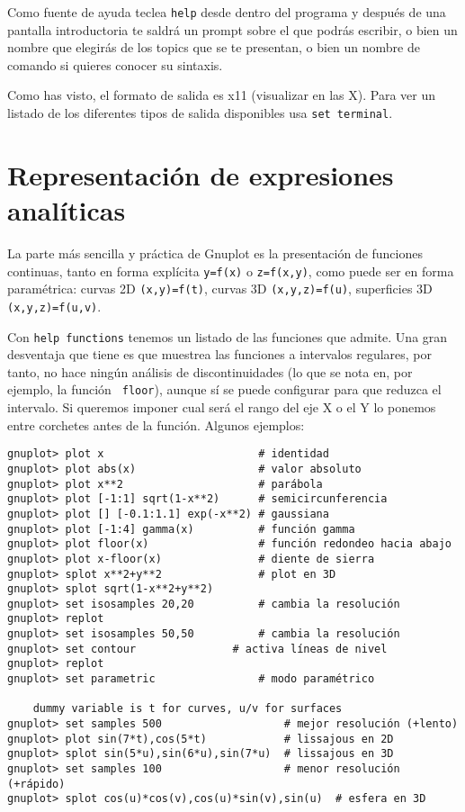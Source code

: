 Como fuente  de ayuda teclea  {\tt help}  desde dentro del  programa y
después de una pantalla introductoria te saldrá un prompt sobre el que
podrás escribir, o bien un nombre que elegirás de los topics que se te
presentan, o bien un nombre de comando si quieres conocer su sintaxis.

Como has  visto, el formato  de salida es  x11 (visualizar en  las X).
Para ver un listado de los  diferentes tipos de salida disponibles usa
{\tt set terminal}.

\section{Representación de expresiones analíticas}

La  parte  más sencilla  y  práctica  de  Gnuplot es  la  presentación
de  funciones  continuas, tanto  en  forma  explícita {\tt  y=f(x)}  o
{\tt  z=f(x,y)},  como  puede  ser en  forma  paramétrica:  curvas  2D
{\tt (x,y)=f(t)},  curvas 3D  {\tt (x,y,z)=f(u)}, superficies  3D {\tt
(x,y,z)=f(u,v)}.

Con  {\tt help  functions} tenemos  un  listado de  las funciones  que
admite. Una  gran desventaja que  tiene es que muestrea  las funciones
a  intervalos  regulares,  por  tanto,  no  hace  ningún  análisis  de
discontinuidades  (lo que  se nota  en, por  ejemplo, la  función {\tt
floor}), aunque sí se puede  configurar para que reduzca el intervalo.
Si queremos  imponer cual será el  rango del eje  X o el Y  lo ponemos
entre corchetes antes de la función. Algunos ejemplos:


\begin{verbatim}
gnuplot> plot x                        # identidad
gnuplot> plot abs(x)                   # valor absoluto
gnuplot> plot x**2                     # parábola
gnuplot> plot [-1:1] sqrt(1-x**2)      # semicircunferencia
gnuplot> plot [] [-0.1:1.1] exp(-x**2) # gaussiana
gnuplot> plot [-1:4] gamma(x)          # función gamma
gnuplot> plot floor(x)                 # función redondeo hacia abajo
gnuplot> plot x-floor(x)               # diente de sierra
gnuplot> splot x**2+y**2               # plot en 3D
gnuplot> splot sqrt(1-x**2+y**2)              
gnuplot> set isosamples 20,20          # cambia la resolución
gnuplot> replot                 
gnuplot> set isosamples 50,50          # cambia la resolución
gnuplot> set contour		       # activa líneas de nivel
gnuplot> replot
gnuplot> set parametric                # modo paramétrico 

	dummy variable is t for curves, u/v for surfaces
gnuplot> set samples 500                   # mejor resolución (+lento)
gnuplot> plot sin(7*t),cos(5*t)            # lissajous en 2D
gnuplot> splot sin(5*u),sin(6*u),sin(7*u)  # lissajous en 3D
gnuplot> set samples 100                   # menor resolución (+rápido)
gnuplot> splot cos(u)*cos(v),cos(u)*sin(v),sin(u)  # esfera en 3D
\end{verbatim}

